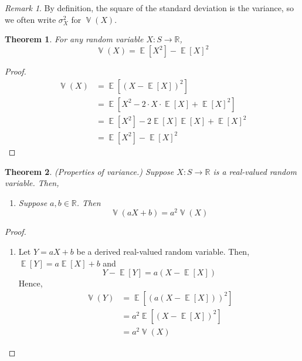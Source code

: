 \documentclass[11pt]{article}
\newtheorem{thm}{Theorem}
\theoremstyle{definition}
\theoremstyle{remark}
\newtheorem{rem}{Remark}[section]
\newcommand{\parens}[1]{\left(#1\right)}
\newcommand{\R}{\mathbb{R}}
\DeclareMathOperator{\Expect}{\mathbb{E}}
\newcommand{\E}[1]{\Expect{\left[#1\right]}}
\DeclareMathOperator{\Var}{\mathbb{V}}
\newcommand{\V}[1]{\Var{\parens{#1}}}
\begin{document}
\begin{rem}
    By definition, the square of the standard deviation is the variance, so we
    often write $\sigma_X^2$ for $\V{X}$.
\end{rem}

\begin{thm}
    \label{thm:alternative-variance}
    For any random variable $X : S \to \R$,
    \begin{equation*}
        \V{X} = \E{X^2} - \E{X}^2
    \end{equation*}
\end{thm}

\begin{proof}
    \begin{align*}
        \V{X}
        &= \E{\parens{X - \E{X}}^2} \\
        &= \E{X^2 - 2 \cdot X \cdot \E{X} + \E{X}^2} \\
        &= \E{X^2} - 2 \E{X} \E{X} + \E{X}^2 \\
        &= \E{X^2} - \E{X}^2
    \end{align*}
\end{proof}

\begin{thm}{(Properties of variance.)}
    \label{thm:variance-properties}
    Suppose $X : S \to \R$ is a real-valued random variable. Then,
    \begin{enumerate}
        \item
            Suppose $a, b \in \R$. Then
            \begin{equation}
                \label{eq:variance-linearity}
                \V{a X + b} = a^2 \V{X}
            \end{equation}
    \end{enumerate}
\end{thm}

\begin{proof}
    \begin{enumerate}
        \item
            Let $Y = a X + b$ be a derived real-valued random variable.
            Then, $\E{Y} = a \E{X} + b$ and
            \begin{equation*}
                Y - \E{Y} = a(X - \E{X})
            \end{equation*}
            Hence,
            \begin{align*}
                \V{Y}
                &= \E{\parens{a\parens{X - \E{X}}}^2} \\
                &= a^2 \E{\parens{X - \E{X}}^2} \\
                &= a^2 \V{X}
            \end{align*}
    \end{enumerate}
\end{proof}
\end{document}
